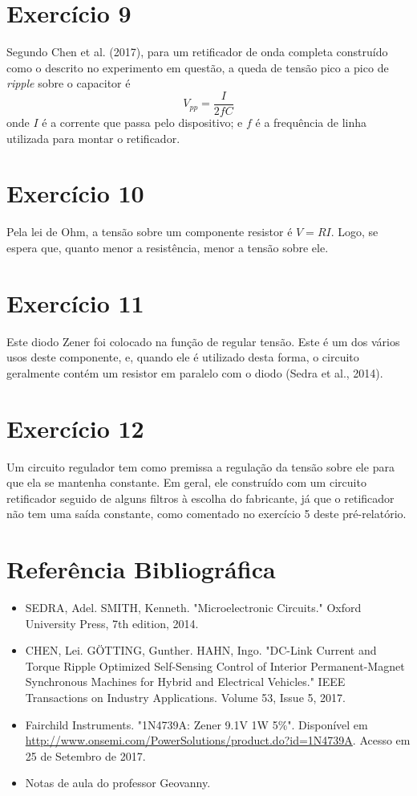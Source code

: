 \documentclass[12pt, a4paper, twoside]{article}
\begin{document}
\section{Exercício 9}

Segundo Chen et al. (2017), para um retificador de onda completa construído como o descrito no experimento em questão, a queda de tensão pico a pico de \textit{ripple} sobre o capacitor é $$V_{pp} = \frac{I}{2fC}$$ onde $I$ é a corrente que passa pelo dispositivo; e $f$ é a frequência de linha utilizada para montar o retificador.

\section{Exercício 10}

Pela lei de Ohm, a tensão sobre um componente resistor é $V=RI$. Logo, se espera que, quanto menor a resistência, menor a tensão sobre ele.

\section{Exercício 11}

Este diodo Zener foi colocado na função de regular tensão. Este é um dos vários usos deste componente, e, quando ele é utilizado desta forma, o circuito geralmente contém um resistor em paralelo com o diodo (Sedra et al., 2014).

\section{Exercício 12}

Um circuito regulador tem como premissa a regulação da tensão sobre ele para que ela se mantenha constante. Em geral, ele construído com um circuito retificador seguido de alguns filtros à escolha do fabricante, já que o retificador não tem uma saída constante, como comentado no exercício 5 deste pré-relatório.

\section{Referência Bibliográfica}

\begin{itemize}
    \item SEDRA, Adel. SMITH, Kenneth. "Microelectronic Circuits."  Oxford University Press, 7th edition, 2014.
    \item CHEN, Lei. GÖTTING, Gunther. HAHN, Ingo. "DC-Link Current and Torque Ripple Optimized Self-Sensing Control of Interior Permanent-Magnet Synchronous Machines for Hybrid and Electrical Vehicles." IEEE Transactions on Industry Applications. Volume 53, Issue 5, 2017.
    \item Fairchild Instruments. "1N4739A: Zener 9.1V 1W 5\%". Disponível em \url{http://www.onsemi.com/PowerSolutions/product.do?id=1N4739A}. Acesso em 25 de Setembro de 2017.
    \item Notas de aula do professor Geovanny.
\end{itemize}
\end{document}
